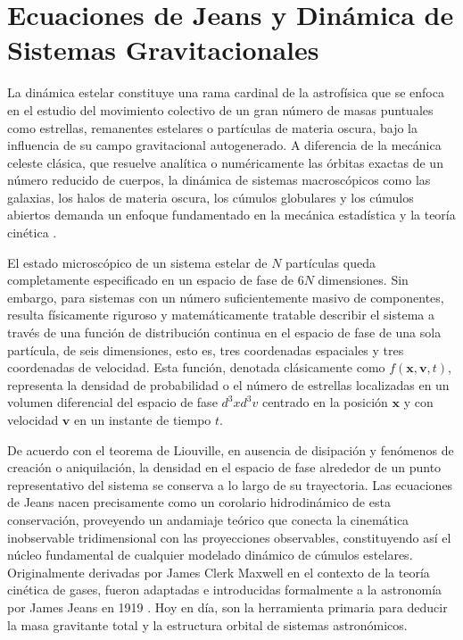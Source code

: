 \section{Ecuaciones de Jeans y Dinámica de Sistemas Gravitacionales}
        La dinámica estelar constituye una rama cardinal de la astrofísica que 
        se enfoca en el estudio del movimiento colectivo de un gran número de 
        masas puntuales como estrellas, remanentes estelares o partículas de 
        materia oscura, bajo  la influencia de su campo gravitacional 
        autogenerado. A diferencia de la mecánica celeste clásica, que resuelve 
        analítica o numéricamente las órbitas exactas de un número reducido de 
        cuerpos, la dinámica de sistemas macroscópicos como las galaxias, los 
        halos de materia oscura, los cúmulos globulares y los cúmulos abiertos 
        demanda un enfoque fundamentado en la mecánica estadística y la teoría 
        cinética \cite{BinneyTremaine2008}. 

        El estado microscópico de un sistema estelar de $N$ partículas queda 
        completamente especificado en un espacio de fase de $6N$ dimensiones. 
        Sin embargo, para sistemas con un número suficientemente masivo de 
        componentes, resulta físicamente riguroso y matemáticamente tratable 
        describir el sistema a través de una función de distribución continua 
        en el espacio de fase de una sola partícula, de seis dimensiones, esto 
        es, tres coordenadas espaciales y tres coordenadas de velocidad. Esta 
        función, denotada clásicamente como $f(\mathbf{x}, \mathbf{v}, t)$, 
        representa la densidad de probabilidad o el número de estrellas 
        localizadas en un volumen diferencial del espacio de fase $d^3x d^3v$ 
        centrado en la posición $\mathbf{x}$ y con velocidad $\mathbf{v}$ en un 
        instante de tiempo $t$.
        
        De acuerdo con el teorema de Liouville, en ausencia de disipación y 
        fenómenos de creación o aniquilación, la densidad en el espacio de fase 
        alrededor de un punto representativo del sistema se conserva a lo largo 
        de su trayectoria. Las ecuaciones de Jeans nacen precisamente como un 
        corolario hidrodinámico de esta conservación, proveyendo un andamiaje 
        teórico que conecta la cinemática inobservable tridimensional con las 
        proyecciones observables, constituyendo así el núcleo fundamental de 
        cualquier modelado dinámico de cúmulos estelares. Originalmente 
        derivadas por James Clerk Maxwell en el contexto de la teoría cinética 
        de gases, fueron adaptadas e introducidas formalmente a la astronomía 
        por James Jeans en 1919 \cite{Jeans1919}. Hoy en día, son la herramienta 
        primaria para deducir la masa gravitante total y la estructura orbital 
        de sistemas astronómicos.

